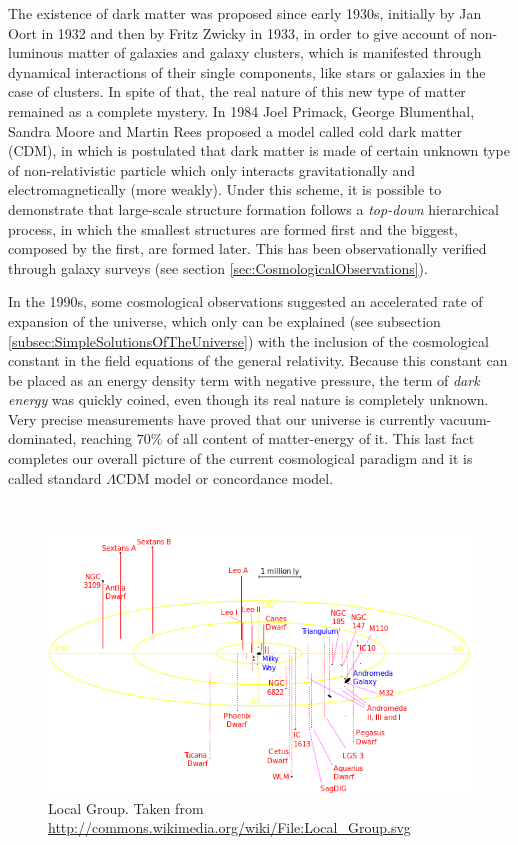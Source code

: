 The existence of dark matter was proposed since early 1930s, initially by
Jan Oort in 1932 and then by Fritz Zwicky in 1933, in order to give account
of non-luminous matter of galaxies and galaxy clusters, which is manifested
through dynamical interactions of their single components, like stars or 
galaxies in the case of clusters. In spite of that, the real nature of this 
new type of matter remained as a complete mystery. In 1984 Joel Primack, 
George Blumenthal, Sandra Moore and Martin Rees proposed a model called 
cold dark matter (CDM), in which is postulated that dark matter is made of 
certain unknown type of non-relativistic particle which only interacts 
gravitationally and electromagnetically (more weakly). Under this scheme, 
it is possible to demonstrate that large-scale structure formation follows 
a \textit{top-down} hierarchical process, in which the smallest structures 
are formed first and the biggest, composed by the first, are formed later. 
This has been observationally verified through galaxy surveys (see section
\ref{sec:CosmologicalObservations}).


In the 1990s, some cosmological observations suggested an accelerated rate
of expansion of the universe, which only can be explained (see subsection 
\ref{subsec:SimpleSolutionsOfTheUniverse}) with the inclusion of the 
cosmological constant in the field equations of the general relativity.
Because this constant can be placed as an energy density term with negative
pressure, the term of \textit{dark energy} was quickly coined, even though 
its real nature is completely unknown. Very precise measurements have 
proved that our universe is currently vacuum-dominated, reaching $70 \%$
of all content of matter-energy of it. This last fact completes our overall
picture of the current cosmological paradigm and it is called standard 
$\Lambda$CDM model or concordance model.


\
\begin{figure}[htbp]
	\centering
	\includegraphics[width=1.0\textwidth]
	{./figures/1_introduction/LocalGroup.png}
	
	\caption{\small{Local Group. Taken from 
	\url{http://commons.wikimedia.org/wiki/File:Local_Group.svg}}}
	
	\label{fig:LocalGroup}
\end{figure}


